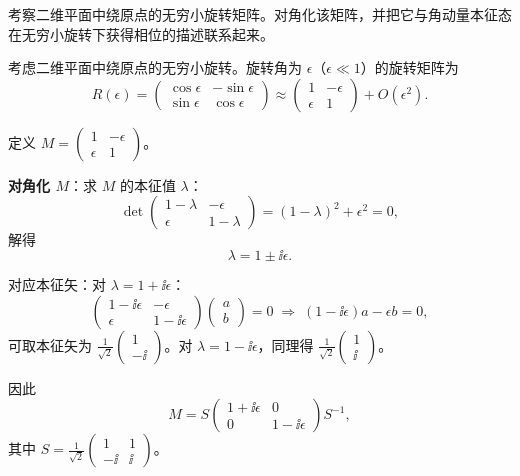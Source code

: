 \begin{question}
考察二维平面中绕原点的无穷小旋转矩阵。对角化该矩阵，并把它与角动量本征态在无穷小旋转下获得相位的描述联系起来。
\end{question}
\begin{solution}
	考虑二维平面中绕原点的无穷小旋转。旋转角为 $\epsilon$（$\epsilon\ll1$）的旋转矩阵为
	\[
	R(\epsilon)=\begin{pmatrix}\cos\epsilon&-\sin\epsilon\\ \sin\epsilon&\cos\epsilon\end{pmatrix}
	\approx\begin{pmatrix}1&-\epsilon\\ \epsilon&1\end{pmatrix}+O(\epsilon^2).
	\]

	定义 $M=\begin{pmatrix}1&-\epsilon\\ \epsilon&1\end{pmatrix}$。

	\textbf{对角化 $M$}：求 $M$ 的本征值 $\lambda$：
	\[
	\det\begin{pmatrix}1-\lambda&-\epsilon\\ \epsilon&1-\lambda\end{pmatrix}
	=(1-\lambda)^2+\epsilon^2=0,
	\]
	解得
	\[
	\lambda = 1\pm \ii\epsilon.
	\]

	对应本征矢：对 $\lambda=1+\ii\epsilon$：
	\[
	\begin{pmatrix}1-\ii\epsilon&-\epsilon\\ \epsilon&1-\ii\epsilon\end{pmatrix}\begin{pmatrix}a\\b\end{pmatrix}=0
	\;\Longrightarrow\; (1-\ii\epsilon)a-\epsilon b=0,
	\]
	可取本征矢为 $\frac{1}{\sqrt{2}}\begin{pmatrix}1\\ -\ii\end{pmatrix}$。对 $\lambda=1-\ii\epsilon$，同理得 $\frac{1}{\sqrt{2}}\begin{pmatrix}1\\ \ii\end{pmatrix}$。

	因此
	\[
	M = S\begin{pmatrix}1+\ii\epsilon&0\\0&1-\ii\epsilon\end{pmatrix}S^{-1},
	\]
	其中 $S=\frac{1}{\sqrt{2}}\begin{pmatrix}1&1\\ -\ii&\ii\end{pmatrix}$。


\end{solution}
